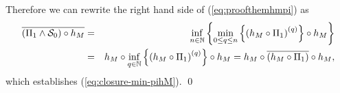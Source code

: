 Therefore we can rewrite the right hand side of
(\ref{eq:proofthemhmpi}) as
\begin{eqnarray*}
\overline{(\Pi_1 \wedge \mathcal S_0) \circ h_M} & = & \inf_{n \in \mathbb{N}} \left\{\min_{0 \leq q \leq n} \left\{ \left(  h_{M} \circ \Pi_1  \right)^{(q)} \right\}  \circ h_{M} \right\} \\
& = &  h_M \circ \inf_{q \in \mathbb{N}} \left\{ \left(  h_{M} \circ \Pi_1  \right)^{(q)}  \right\}  \circ h_{M} = h_{M} \circ \overline{ ( h_{M} \circ \Pi_1  ) }  \circ h_{M},
\end{eqnarray*}
which establishes (\ref{eq:closure-min-pihM}).
\qed

%
%
